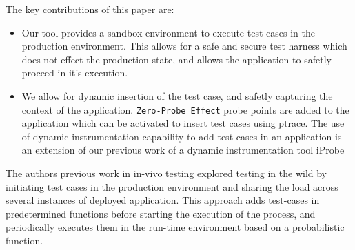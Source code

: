 The key contributions of this paper are:

\begin{itemize}
\item Our tool provides a sandbox environment to execute test cases in the production environment. 
This allows for a safe and secure test harness which does not effect the production state, and allows the application to safetly proceed in it's execution.
\item We allow for dynamic insertion of the test case, and safetly capturing the context of the application. 
\texttt{Zero-Probe Effect} probe points are added to the application which can be activated to insert test cases using ptrace\cite{ptrace}.
The use of dynamic instrumentation capability to add test cases in an application is an extension of our previous work of a dynamic instrumentation tool iProbe \cite{iProbe}
\end{itemize}

The authors previous work in in-vivo testing\cite{invite} explored testing in the wild by initiating test cases in the production environment and sharing the load across several instances of deployed application.
This approach adds test-cases in predetermined functions before starting the execution of the process, and periodically executes them in the run-time environment based on a probabilistic function. 

\cite{dapper}


